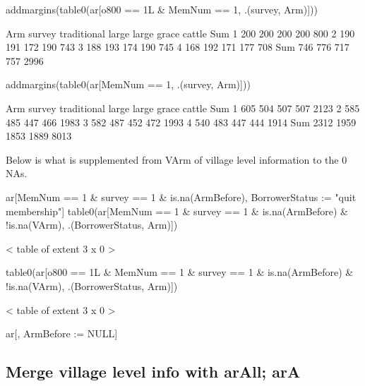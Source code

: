 \begin{Schunk}
\begin{Sinput}
addmargins(table0(ar[o800 == 1L & MemNum == 1, .(survey, Arm)]))
\end{Sinput}
\begin{Soutput}
      Arm
survey traditional large large grace cattle  Sum
   1           200   200         200    200  800
   2           190   191         172    190  743
   3           188   193         174    190  745
   4           168   192         171    177  708
   Sum         746   776         717    757 2996
\end{Soutput}
\begin{Sinput}
addmargins(table0(ar[MemNum == 1, .(survey, Arm)]))
\end{Sinput}
\begin{Soutput}
      Arm
survey traditional large large grace cattle  Sum
   1           605   504         507    507 2123
   2           585   485         447    466 1983
   3           582   487         452    472 1993
   4           540   483         447    444 1914
   Sum        2312  1959        1853   1889 8013
\end{Soutput}
\end{Schunk}
Below is what is supplemented from \textsf{VArm} of village level information to the 0 NAs.
\begin{Schunk}
\begin{Sinput}
ar[MemNum == 1 & survey == 1 & is.na(ArmBefore), 
  BorrowerStatus := "quit membership"]
table0(ar[MemNum == 1 & survey == 1 & is.na(ArmBefore) & !is.na(VArm), 
  .(BorrowerStatus, Arm)])
\end{Sinput}
\begin{Soutput}
< table of extent 3 x 0 >
\end{Soutput}
\begin{Sinput}
table0(ar[o800 == 1L & MemNum == 1 & survey == 1 & is.na(ArmBefore) & !is.na(VArm), 
  .(BorrowerStatus, Arm)])
\end{Sinput}
\begin{Soutput}
< table of extent 3 x 0 >
\end{Soutput}
\begin{Sinput}
ar[, ArmBefore := NULL]
\end{Sinput}
\end{Schunk}

\subsection{Merge village level info with \textsf{arAll}; \textsf{arA}}

